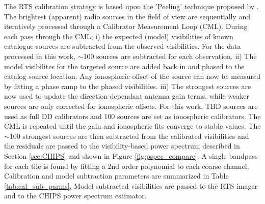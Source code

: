 \documentclass[preprint]{aastex}
\begin{document}
The RTS calibration strategy is based upon the 'Peeling' technique proposed by \cite{Noordam:2004p2379}. The brightest (apparent) radio sources in the field of view are sequentially and iteratively processed through a Calibrator Measurement Loop (CML). During each pass through the CML; i) the expected (model) visibilities of known catalogue sources are subtracted from the observed visibilities. For the data processed in this work, $\sim$100 sources are subtracted for each observation. ii) The model visibilites for the targeted source are added back in and phased to the catalog source location. Any ionospheric offset of the source can now be measured by fitting a phase ramp to the phased visibilities. iii) The strongest sources are now used to update the direction-dependant antenna gain terms, while weaker sources are only corrected for ionospheric offsets. For this work, TBD sources are used as full DD calibrators and 100 sources are set as ionospheric calibrators. The CML is repeated until the gain and ionospheric fits converge to stable values. The $\sim$100 strongest sources are then subtracted from the calibrated visibilities and the residuals are passed to the visibility-based power spectrum described in Section \ref{sec:CHIPS} and shown in Figure \ref{fig:pspec_compare}.  A single bandpass for each tile is found by fitting a 2nd order polynomial to each coarse channel. Calibration and model subtraction parameters are summarized in Table \ref{tab:cal_sub_parms}.  Model subtracted visibilities are passed to the RTS imager and to the CHIPS power spectrum estimator. %
\end{document}
